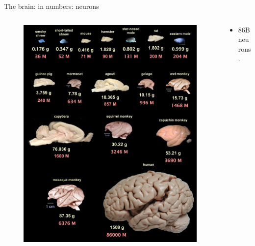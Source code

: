 \begin{frame}[c]{The brain: in numbers: neurons}
  \begin{columns}
    \begin{column}{0.5\textwidth}
      \begin{figure}[h]
        \centering
        \includegraphics[width=\textwidth]{99_images/brain-sizes.jpg}
      \end{figure}
    \end{column}
    \begin{column}{0.5\textwidth}
      \begin{itemize}
        \item \alert{86B} neurons\footnotemark{}.
      \end{itemize}
    \end{column}
  \end{columns}
  \vspace{0.2cm}
\end{frame}
